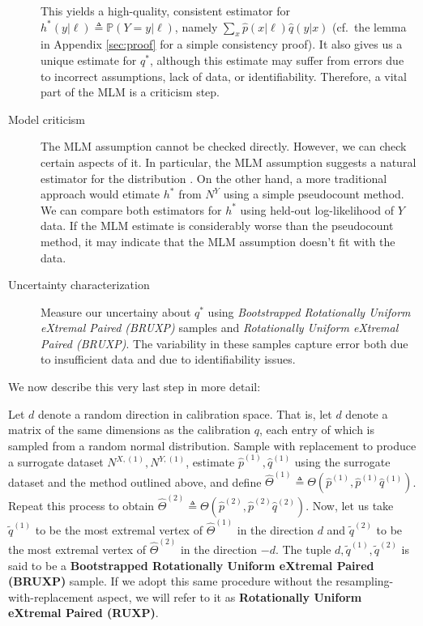 \begin{description}
This yields a high-quality, consistent estimator for $h^*(y|\ell)\triangleq \mathbb{P}(Y=y|\ell)$, namely $\sum_x \hat p(x|\ell) \hat q(y|x)$ (cf.\ the lemma in Appendix \ref{sec:proof} for a simple consistency proof).  It also gives us a unique estimate for $q^*$, although this estimate may suffer from errors due to incorrect assumptions, lack of data, or identifiability.  Therefore, a vital part of the MLM is a criticism step.
\item[Model criticism]  The MLM assumption cannot be checked directly.  However, we can check certain aspects of it.  In particular, the MLM assumption suggests a natural estimator for the distribution .  On the other hand, a more traditional approach would etimate $h^*$ from $N^Y$ using a simple pseudocount method.  We can compare both estimators for $h^*$ using held-out log-likelihood of $Y$ data.  If the MLM estimate is considerably worse than the pseudocount method, it may indicate that the MLM assumption doesn't fit with the data.
\item[Uncertainty characterization] Measure our uncertainy about $q^*$ using \emph{Bootstrapped Rotationally Uniform eXtremal Paired (BRUXP)} samples and \emph{Rotationally Uniform eXtremal Paired (BRUXP)}.  The variability in these samples capture error both due to insufficient data and due to identifiability issues.  
\end{description}

We now describe this very last step in more detail:

\vspace{.2in}
\begin{definition}
Let $d$ denote a random direction in calibration space.  That is, let $d$ denote a matrix of the same dimensions as the calibration $q$, each entry of which is sampled from a random normal distribution.  Sample with replacement to produce a surrogate dataset $N^{X,(1)},N^{Y,(1)}$, estimate $\hat p^{(1)},\hat q^{(1)}$ using the surrogate dataset and the method outlined above, and define $\hat \Theta^{(1)} \triangleq \Theta(\hat p^{(1)},\hat p^{(1)}\hat q^{(1)})$.  Repeat this process to obtain $\hat \Theta^{(2)} \triangleq \Theta(\hat p^{(2)},\hat p^{(2)}\hat q^{(2)})$.  Now, let us take $\tilde q^{(1)}$ to be the most extremal vertex of $\hat \Theta^{(1)}$ in the direction $d$ and $\tilde q^{(2)}$ to be the most extremal vertex of $\hat \Theta^{(2)}$ in the direction $-d$.  The tuple $d,\tilde q^{(1)},\tilde q^{(2)}$ is said to be a \textbf{Bootstrapped Rotationally Uniform eXtremal Paired (BRUXP)} sample.  If we adopt this same procedure without the resampling-with-replacement aspect, we will refer to it as \textbf{Rotationally Uniform eXtremal Paired (RUXP)}.  
\end{definition}

